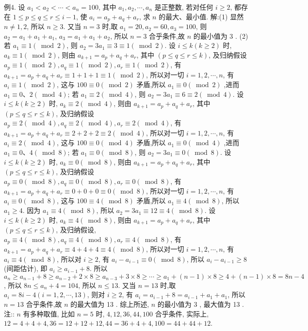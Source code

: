 例4. 设 $a_1<a_2<\cdots<a_n=100$, 其中 $a_1, a_2, \cdots, a_n$ 是正整数, 若对任何 $i \geqslant 2$, 都存在 $1 \leqslant p \leqslant q \leqslant r \leqslant i-1$, 使 $a_i=a_p+a_q+a_r$, 求 $n$ 的最大、最小值.
解:(1) 显然 $n \neq 1,2$, 所以 $n \geqslant 3$.
又当 $n=3$ 时,取 $a_1=20, a_2=60, a_3=100$, 则 $a_2=a_1+a_1+a_1$, $a_3=a_1+a_1+a_2$, 所以 $n=3$ 合乎条件,故 $n$ 的最小值为 3 .
(2) 若 $a_1 \equiv 1(\bmod 2)$, 则 $a_2=3 a_1 \equiv 3 \equiv 1(\bmod 2)$. 设 $i \leqslant k(k \geqslant 2)$ 时, $a_k \equiv 1(\bmod 2)$, 则由 $a_{k+1}=a_p+a_q+a_r$, 其中 $(p \leqslant q \leqslant r \leqslant k)$, 及归纳假设 $a_p \equiv 1(\bmod 2), a_q \equiv 1(\bmod 2), a_r \equiv 1(\bmod 2)$, 有 $a_{k+1}=a_p+a_q+a_r \equiv 1+1+1 \equiv 1(\bmod 2)$, 所以对一切 $i=1,2, \cdots, n$, 有 $a_i \equiv 1(\bmod 2)$, 这与 $100 \equiv 0(\bmod 2)$ 矛盾,所以 $a_1 \equiv 0(\bmod 2)$ ,进而 $a_1 \equiv 0 、 2(\bmod 4)$;
若 $a_1 \equiv 2(\bmod 4)$, 则 $a_2=3 a_1 \equiv 6 \equiv 2(\bmod 4)$. 设 $i \leqslant k(k \geqslant 2)$ 时, $a_k \equiv 2(\bmod 4)$, 则由 $a_{k+1}=a_p+a_q+a_r$, 其中 $(p \leqslant q \leqslant r \leqslant k)$, 及归纳假设 $a_p \equiv 2(\bmod 4), a_q \equiv 2(\bmod 4), a_r \equiv 2(\bmod 4)$, 有 $a_{k+1}=a_p+a_q+a_r \equiv 2+2+2 \equiv 2(\bmod 4)$, 所以对一切 $i=1,2, \cdots, n$, 有 $a_i \equiv 2(\bmod 4)$, 这与 $100 \equiv 0(\bmod 4)$ 矛盾,所以 $a_1 \equiv 0(\bmod 4)$ ,进而 $a_1 \equiv 0 、 4(\bmod 8)$;
若 $a_1 \equiv 0(\bmod 8)$, 则 $a_2=3 a_1 \equiv 0(\bmod 8)$. 设 $i \leqslant k(k \geqslant 2)$ 时, $a_k \equiv 0(\bmod 8)$, 则由 $a_{k+1}=a_p+a_q+a_r$, 其中 $(p \leqslant q \leqslant r \leqslant k)$, 及归纳假设 $a_p \equiv 0(\bmod 8), a_q \equiv 0(\bmod 8), a_r \equiv 0(\bmod 8)$, 有 $a_{k+1}=a_p+a_q+a_r \equiv 0+0+ 0 \equiv 0(\bmod 8)$, 所以对一切 $i=1,2, \cdots, n$, 有 $a_i \equiv 0(\bmod 8)$, 这与 $100 \equiv 4(\bmod 8)$ 矛盾,所以 $a_1 \equiv 4(\bmod 8)$, 所以 $a_1 \geqslant 4$.
因为 $a_1 \equiv 4(\bmod 8)$, 所以 $a_2=3 a_1 \equiv 12 \equiv 4(\bmod 8)$. 设 $i \leqslant k(k \geqslant 2)$ 时, $a_k \equiv 4(\bmod 8)$, 则由 $a_{k+1}=a_p+a_q+a_r$, 其中 $(p \leqslant q \leqslant r \leqslant k)$, 及归纳假设, $a_p \equiv 4(\bmod 8), a_q \equiv 4(\bmod 8), a_r \equiv 4(\bmod 8)$, 有 $a_{k+1}=a_p+a_q+a_r \equiv 4+4+4 \equiv 4(\bmod 8)$, 所以对一切 $i=1,2, \cdots, n$, 有 $a_i \equiv 4(\bmod 8)$, 所以对 $i \geqslant 2$, 有 $a_i-a_{i-1} \equiv 0(\bmod 8)$, 所以 $a_i-a_{i-1} \geqslant 8$ (间距估计), 即 $a_i \geqslant a_{i-1}+8$.
所以 $a_n \geqslant a_{n-1}+8 \geqslant a_{n-2}+2 \times 8 \geqslant a_{n-3}+3 \times 8 \geqslant \cdots \geqslant a_1+(n-1) \times 8 \geqslant 4+(n-1) \times 8=8 n-4$, 所以 $8 n \leqslant a_n+4=104$, 所以 $n \leqslant 13$.
又当 $n=13$ 时,取 $a_i=8 i-4(i=1,2, \cdots, 13)$, 则对 $i \geqslant 2$, 有 $a_i= a_{i-1}+8=a_{i-1}+a_1+a_1$, 所以 $n=13$ 合乎条件,故 $n$ 的最大值为 13 .
综上所述, $n$ 的最小值为 3 , 最大值为 13 .
注:: $n$ 有多种取值, 比如 $n=5$ 时, $4,12,36,44,100$ 合乎条件, 实际上, $12=4+4+4,36=12+12+12,44=36+4+4,100=44+44+12$.


